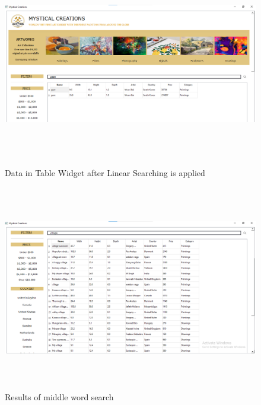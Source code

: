 \documentclass[12pt]{article}
\begin{document}
    \newpage
    \begin{figure}[ht!]
	    \includegraphics[width = 16cm, height = 9cm]{Searched Data.png} 
	    \renewcommand{\thefigure}{3.7}
	    \caption{Data in Table Widget after Linear Searching is applied}
    \end{figure}
    \begin{figure}[ht!]
	    \includegraphics[width = 16cm, height = 9cm]{Middle Words Search.png}
	    \renewcommand{\thefigure}{3.8}
	    \caption{Results of middle word search}
    \end{figure}
    
\end{document}
